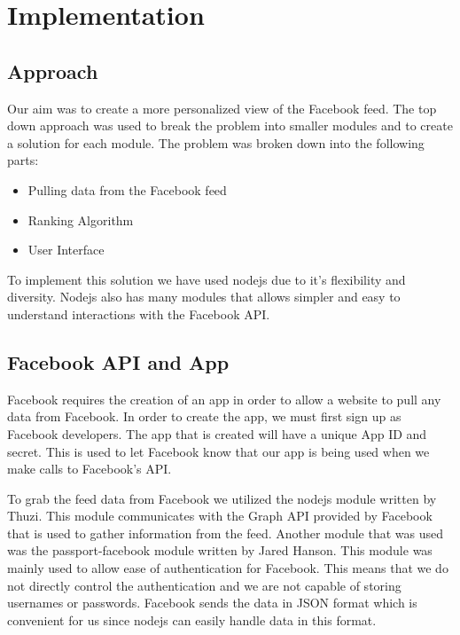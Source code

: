 
\chapter{Implementation}\label{ch:implementation}

\section{Approach}

Our aim was to create a more personalized view of the Facebook feed. The top down approach was used to break the problem into smaller modules and to create a solution for each module. The problem was broken down into the following parts:

\begin{itemize}
 	\item Pulling data from the Facebook feed
	\item Ranking Algorithm
  	\item User Interface
\end{itemize}

To implement this solution we have used nodejs due to it's flexibility and diversity. Nodejs also has many modules that allows simpler and easy to understand interactions with the Facebook API. 

\section{Facebook API and App}

Facebook requires the creation of an app in order to allow a website to pull any data from Facebook. In order to create the app, we must first sign up as Facebook developers. The app that is created will have a unique App ID and secret. This is used to let Facebook know that our app is being used when we make calls to Facebook's API.  

To grab the feed data from Facebook we utilized the nodejs module written by Thuzi. This module communicates with the Graph API provided by Facebook that is used to gather information from the feed. Another module that was used was the passport-facebook module written by Jared Hanson. This module was mainly used to allow ease of authentication for Facebook. This means that we do not directly control the authentication and we are not capable of storing usernames or passwords. Facebook sends the data in JSON format which is convenient for us since nodejs can easily handle data in this format. 

